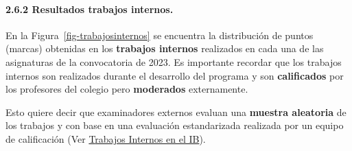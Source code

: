 \documentclass[
  letterpaper,
  DIV=11,
  numbers=noendperiod]{scrartcl}
\let\oldparagraph\paragraph
\renewcommand{\paragraph}[1]{\oldparagraph{#1}\mbox{}}
\begin{document}
\hypertarget{resultados-trabajos-internos.}{%
\paragraph{2.6.2 Resultados trabajos
internos.}\label{resultados-trabajos-internos.}}

En la Figura~\ref{fig-trabajosinternos} se encuentra la distribución de
puntos (marcas) obtenidas en los \textbf{trabajos internos} realizados
en cada una de las asignaturas de la convocatoria de 2023. Es importante
recordar que los trabajos internos son realizados durante el desarrollo
del programa y son \textbf{calificados} por los profesores del colegio
pero \textbf{moderados} externamente.

Esto quiere decir que examinadores externos evaluan una \textbf{muestra
aleatoria} de los trabajos y con base en una evaluación estandarizada
realizada por un equipo de calificación (Ver
\href{https://gcbedu-my.sharepoint.com/:w:/g/personal/jorge_baquero_gcb_edu_co/ERPkujLt3cxOmSvqGgB_nZkBO3CTetFTRnR0So4bU0VZAw?e=a7stXi}{T}\href{https://gcbedu-my.sharepoint.com/:b:/g/personal/jorge_baquero_gcb_edu_co/EVuAFyiF1sxKgPkM42pP3coBNUqCyVD0jUB2mELz2BWs0w?e=FBcclx}{rabajos
Internos en el IB}).
\end{document}
